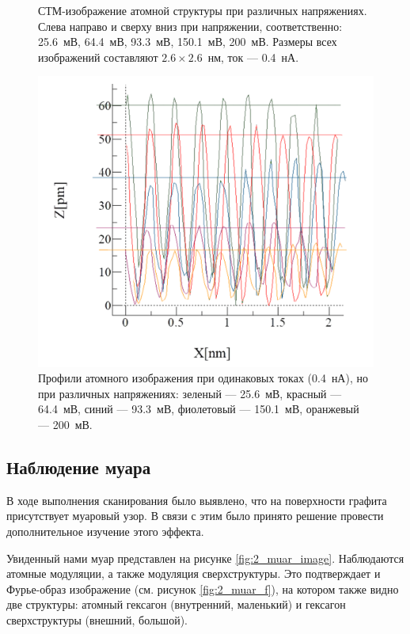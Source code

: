 \documentclass[a4paper, 12pt]{article}
\begin{document}
\begin{figure}[H]
		\caption{СТМ-изображение атомной структуры при различных напряжениях. Слева направо и сверху вниз при напряжении, соответственно: 25.6~мВ, 64.4~мВ, 93.3~мВ, 150.1~мВ, 200~мВ. Размеры всех изображений составляют $2.6\times2.6$~нм, ток --- 0.4~нА.}
		\label{fig:2_different_volt}
	\end{figure}

	\begin{figure}[H]
		\centering
		\includegraphics[width=0.9\linewidth]{../STM_data/STM_Profiles/Graphs/All_graphs}
		\caption{Профили атомного изображения при одинаковых токах (0.4~нА), но при различных напряжениях: зеленый --- 25.6~мВ, красный --- 64.4~мВ, синий --- 93.3~мВ, фиолетовый --- 150.1~мВ, оранжевый --- 200~мВ.}
		\label{fig:2_different_volt_profiles}
	\end{figure}


	
	\subsection{Наблюдение муара}
	
	В ходе выполнения сканирования было выявлено, что на поверхности графита присутствует муаровый узор. В связи с этим было принято решение провести дополнительное изучение этого эффекта.
	
	Увиденный нами муар представлен на рисунке \ref{fig:2_muar_image}. Наблюдаются атомные модуляции, а также модуляция сверхструктуры. Это подтверждает и Фурье-образ изображение (см. рисунок \ref{fig:2_muar_f}), на котором также видно две структуры: атомный гексагон (внутренний, маленький) и гексагон сверхструктуры (внешний, большой).
	
\end{document}
